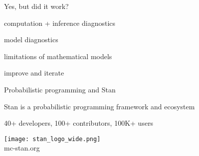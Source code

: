 \documentclass[english,t]{beamer}
\begin{document}
\begin{frame}{Yes, but did it work?}

  \vspace{\baselineskip}
\hspace{1cm}  \begin{minipage}[t]{0.8\linewidth}
computation + inference diagnostics
      \vspace{\baselineskip}

model diagnostics
      \vspace{\baselineskip}

limitations of mathematical models
      \vspace{\baselineskip}

improve and iterate
\end{minipage}

\end{frame}

\begin{frame}{Probabilistic programming and Stan}

  Stan is a probabilistic programming framework and ecosystem

  40+ developers, 100+ contributors, 100K+ users

  \center
  \vspace{\baselineskip}
  \texttt{[image: stan\_logo\_wide.png]}\\
  mc-stan.org
  
\end{frame}
\end{document}

